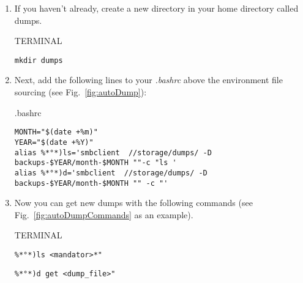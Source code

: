 \documentclass[10pt,a4paper]{article}
\begin{document}
\begin{enumerate}
\item{} If you haven't already, create a new directory in your home directory called dumps.

\begin{command}{TERMINAL}

\begin{lstlisting}
mkdir dumps
\end{lstlisting}
\end{command}

\item{} Next, add the following lines to your \textit{.bashrc} above the environment file sourcing (see Fig.~\ref{fig:autoDump}):

\begin{command}{.bashrc}

\begin{lstlisting}
MONTH="$(date +%m)"
YEAR="$(date +%Y)"
alias %*°*)ls='smbclient  //storage/dumps/ -D backups-$YEAR/month-$MONTH ""-c "ls '
alias %*°*)d='smbclient  //storage/dumps/ -D backups-$YEAR/month-$MONTH "" -c "' 
\end{lstlisting}


\end{command}

\item{} Now you can get new dumps with the following commands (see Fig.~\ref{fig:autoDumpCommands} as an example).

\begin{command}{TERMINAL}

\begin{lstlisting}
%*°*)ls <mandator>*"
\end{lstlisting}

\begin{lstlisting}
%*°*)d get <dump_file>"
\end{lstlisting}


\end{command}

\end{enumerate}
\end{document}
